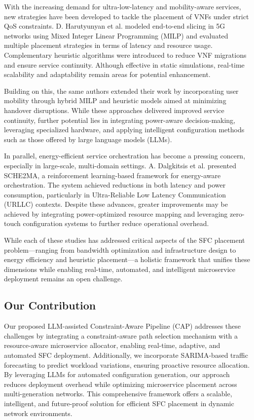 \documentclass[conference]{IEEEtran}
\begin{document}
With the increasing demand for ultra-low-latency and mobility-aware services, new strategies have been developed to tackle the placement of VNFs under strict QoS constraints. D. Harutyunyan et al. modeled end-to-end slicing in 5G networks using Mixed Integer Linear Programming (MILP) and evaluated multiple placement strategies in terms of latency and resource usage. Complementary heuristic algorithms were introduced to reduce VNF migrations and ensure service continuity. Although effective in static simulations, real-time scalability and adaptability remain areas for potential enhancement.

Building on this, the same authors extended their work by incorporating user mobility through hybrid MILP and heuristic models aimed at minimizing handover disruptions. While these approaches delivered improved service continuity, further potential lies in integrating power-aware decision-making, leveraging specialized hardware, and applying intelligent configuration methods such as those offered by large language models (LLMs).

In parallel, energy-efficient service orchestration has become a pressing concern, especially in large-scale, multi-domain settings. A. Dalgkitsis et al. presented SCHE2MA, a reinforcement learning-based framework for energy-aware orchestration. The system achieved reductions in both latency and power consumption, particularly in Ultra-Reliable Low Latency Communication (URLLC) contexts. Despite these advances, greater improvements may be achieved by integrating power-optimized resource mapping and leveraging zero-touch configuration systems to further reduce operational overhead.

While each of these studies has addressed critical aspects of the SFC placement problem—ranging from bandwidth optimization and infrastructure design to energy efficiency and heuristic placement—a holistic framework that unifies these dimensions while enabling real-time, automated, and intelligent microservice deployment remains an open challenge.

\subsection{Our Contribution}

Our proposed LLM-assisted Constraint-Aware Pipeline (CAP) addresses these challenges by integrating a constraint-aware path selection mechanism with a resource-aware microservice allocator, enabling real-time, adaptive, and automated SFC deployment. Additionally, we incorporate SARIMA-based traffic forecasting to predict workload variations, ensuring proactive resource allocation. By leveraging LLMs for automated configuration generation, our approach reduces deployment overhead while optimizing microservice placement across multi-generation networks. This comprehensive framework offers a scalable, intelligent, and future-proof solution for efficient SFC placement in dynamic network environments.
\end{document}
